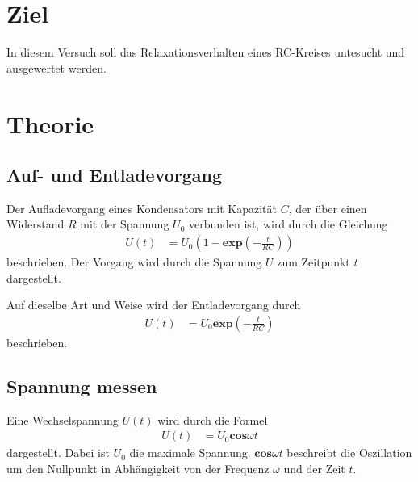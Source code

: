 
\section{Ziel}
In diesem Versuch soll das Relaxationsverhalten eines RC-Kreises untesucht und ausgewertet werden. 

\section{Theorie }
\label{sec:Theorie}
\subsection{Auf- und Entladevorgang}
Der Aufladevorgang eines Kondensators mit Kapazität $C$, der über einen Widerstand $R$ mit der Spannung $U_{0}$ verbunden ist, wird durch die Gleichung
\begin{align*}
     U(t)&= U_{0} (1-\mathbf{exp}(-\frac{t}{RC}))
\end{align*}
beschrieben. Der Vorgang wird durch die Spannung $U$ zum Zeitpunkt $t$ dargestellt. 

\noindent Auf dieselbe Art und Weise wird der Entladevorgang durch
\begin{align*}
     U(t)&= U_{0} \mathbf{exp}(-\frac{t}{RC})
\end{align*}
beschrieben. 

\subsection{Spannung messen}
Eine Wechselspannung $U(t)$ wird durch die Formel 
\begin{align*} 
    U(t)&= U_{0} \mathbf{cos}\omega t 
\end{align*}
dargestellt. Dabei ist $U_{0}$ die maximale Spannung. $\mathbf{cos}\omega t$ beschreibt die Oszillation um den Nullpunkt in Abhängigkeit von der Frequenz $\omega$ und der Zeit $t$. 

